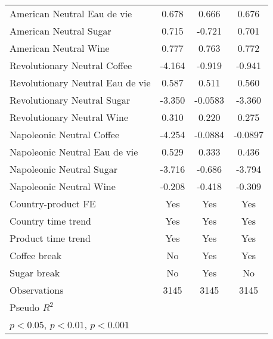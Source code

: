 \begin{table}[htbp]
\begin{tabular}{l*{3}{c}}
American Neutral Eau de vie&       0.678         &       0.666         &       0.676         \\
American Neutral Sugar&       0.715\sym{**} &      -0.721\sym{**} &       0.701\sym{**} \\
American Neutral Wine&       0.777         &       0.763         &       0.772         \\
Revolutionary Neutral Coffee&      -4.164\sym{***}&      -0.919         &      -0.941         \\
Revolutionary Neutral Eau de vie&       0.587\sym{*}  &       0.511\sym{*}  &       0.560\sym{*}  \\
Revolutionary Neutral Sugar&      -3.350\sym{***}&     -0.0583         &      -3.360\sym{***}\\
Revolutionary Neutral Wine&       0.310         &       0.220         &       0.275         \\
Napoleonic Neutral Coffee&      -4.254\sym{***}&     -0.0884         &     -0.0897         \\
Napoleonic Neutral Eau de vie&       0.529         &       0.333         &       0.436         \\
Napoleonic Neutral Sugar&      -3.716\sym{***}&      -0.686         &      -3.794\sym{***}\\
Napoleonic Neutral Wine&      -0.208         &      -0.418         &      -0.309         \\
Country-product FE  &         Yes         &         Yes         &         Yes         \\
Country time trend  &         Yes         &         Yes         &         Yes         \\
Product time trend  &         Yes         &         Yes         &         Yes         \\
Coffee break        &          No         &         Yes         &         Yes         \\
Sugar break         &          No         &         Yes         &          No         \\
\hline
Observations        &        3145         &        3145         &        3145         \\
Pseudo \(R^{2}\)    &                     &                     &                     \\
\hline\hline
\multicolumn{4}{l}{\footnotesize \sym{*} \(p<0.05\), \sym{**} \(p<0.01\), \sym{***} \(p<0.001\)}\\
\end{tabular}
\end{table}
